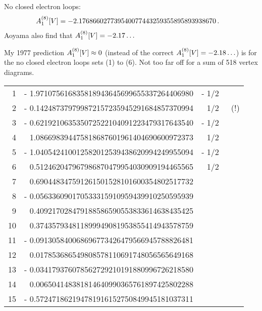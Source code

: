 \begin{description}
No closed electron loops:
\begin{align}
 A_1^{(8)}[V]&= -2.176866027739540077443259355895893938670 \,.
\end{align}
Aoyama \etal{} also find that $A_1^{(8)}[V]= -2.17\dots$

My 1977 prediction $A_1^{(8)}[V] \approx  0$
(instead of the correct $A_1^{(8)}[V]= -2.18\ldots$) is for the no closed
electron loops sets (1) to (6). Not too far off for a sum of 518 vertex
diagrams.

\begin{table}
\small
\begin{center}
\begin{tabular}{rrrr}
\hline
   1  & - 1.971075616835818943645699655337264406980    & - 1/2  \\%
   2  & - 0.142487379799872157235945291684857370994  & \phantom{+} 1/2 &~(!)\\%
   3  & - 0.621921063535072522104091223479317643540  & - 1/2  \\%
   4  & \phantom{+} 1.086698394475818687601961404690600972373  & \phantom{+} 1/2  \\%
   5  & - 1.040542410012582012539438620994249955094   & - 1/2  \\%
   6  & \phantom{+} 0.512462047967986870479954030909194465565  & \phantom{+} 1/2  \\%
\hline
   7  & \phantom{+} 0.690448347591261501528101600354802517732  \\%
   8  & - 0.056336090170533315910959439910250595939  \\%
   9  & \phantom{+} 0.409217028479188586590553833614638435425  \\%
   10 & \phantom{+} 0.374357934811899949081953855414943578759  \\%
   11 & - 0.091305840068696773426479566945788826481  \\%
   12 & \phantom{+} 0.017853686549808578110691748056565649168  \\%
   13 & - 0.034179376078562729210191880996726218580  \\%
   14 & \phantom{+} 0.006504148381814640990365761897425802288  \\%
   15 & - 0.572471862194781916152750849945181037311  \\%

\end{tabular}
\end{center}
\end{table}
\end{description}
